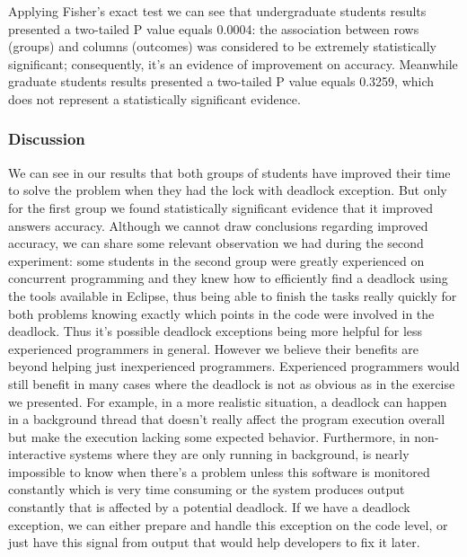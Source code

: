 Applying Fisher's exact test we can see that undergraduate students results presented a two-tailed P value equals 0.0004: the association between rows (groups) and columns (outcomes) was considered to be extremely statistically significant; consequently, it's an evidence of improvement on accuracy. Meanwhile graduate students results presented a two-tailed P value equals 0.3259, which does not represent a statistically significant evidence.


\subsubsection{Discussion}


We can see in our results that both groups of students have improved their time to solve the problem when they had the lock with deadlock exception. But only for the first group we found statistically significant evidence that it improved answers accuracy. Although we cannot draw conclusions regarding improved accuracy, we can share some relevant observation we had during the second experiment: some students in the second group were greatly experienced on concurrent programming and they knew how to efficiently find a deadlock using the tools available in Eclipse, thus being able to finish the tasks really quickly for both problems knowing exactly which points in the code were involved in the deadlock. Thus it's possible deadlock exceptions being more helpful for less experienced programmers in general. However we believe their benefits are beyond helping just inexperienced programmers. Experienced programmers would still benefit in many cases where the deadlock is not as obvious as in the exercise we presented. For example, in a more realistic situation, a deadlock can happen in a background thread that doesn't really affect the program execution overall but make the execution lacking some expected behavior. Furthermore, in non-interactive systems where they are only running in background, is nearly impossible to know when there's a problem unless this software is monitored constantly which is very time consuming or the system produces output constantly that is affected by a potential deadlock. If we have a deadlock exception, we can either prepare and handle this exception on the code level, or just have this signal from output that would help developers to fix it later.

